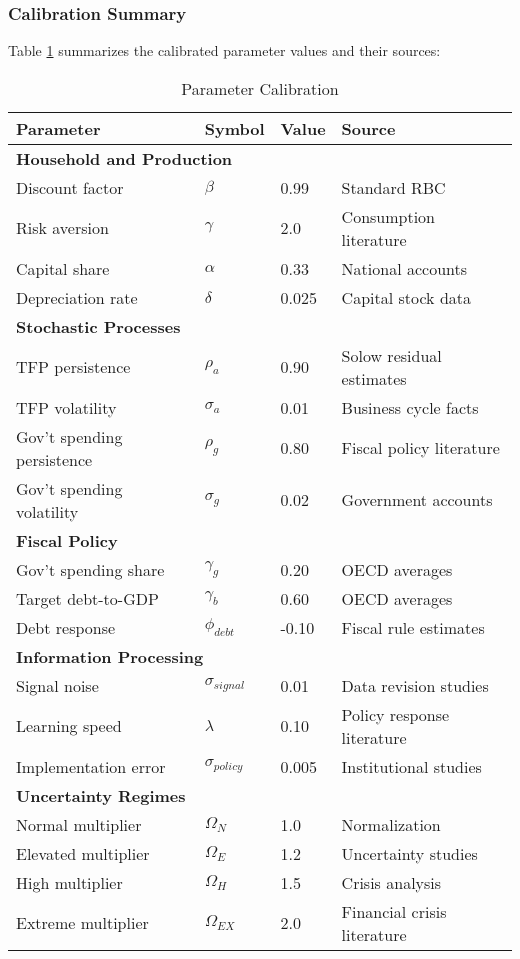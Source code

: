 \documentclass[5p,authoryear]{elsarticle}
\begin{document}
\subsubsection{Calibration Summary}

Table \ref{tab:calibration} summarizes the calibrated parameter values and their sources:

\begin{table}[h!]
\centering
\caption{Parameter Calibration}
\label{tab:calibration}
\begin{tabular}{llll}
\toprule
Parameter & Symbol & Value & Source \\
\midrule
\multicolumn{4}{l}{\textbf{Household and Production}} \\
Discount factor & $\beta$ & 0.99 & Standard RBC \\
Risk aversion & $\gamma$ & 2.0 & Consumption literature \\
Capital share & $\alpha$ & 0.33 & National accounts \\
Depreciation rate & $\delta$ & 0.025 & Capital stock data \\
\midrule
\multicolumn{4}{l}{\textbf{Stochastic Processes}} \\
TFP persistence & $\rho_a$ & 0.90 & Solow residual estimates \\
TFP volatility & $\sigma_a$ & 0.01 & Business cycle facts \\
Gov't spending persistence & $\rho_g$ & 0.80 & Fiscal policy literature \\
Gov't spending volatility & $\sigma_g$ & 0.02 & Government accounts \\
\midrule
\multicolumn{4}{l}{\textbf{Fiscal Policy}} \\
Gov't spending share & $\gamma_g$ & 0.20 & OECD averages \\
Target debt-to-GDP & $\gamma_b$ & 0.60 & OECD averages \\
Debt response & $\phi_{debt}$ & -0.10 & Fiscal rule estimates \\
\midrule
\multicolumn{4}{l}{\textbf{Information Processing}} \\
Signal noise & $\sigma_{signal}$ & 0.01 & Data revision studies \\
Learning speed & $\lambda$ & 0.10 & Policy response literature \\
Implementation error & $\sigma_{policy}$ & 0.005 & Institutional studies \\
\midrule
\multicolumn{4}{l}{\textbf{Uncertainty Regimes}} \\
Normal multiplier & $\Omega_N$ & 1.0 & Normalization \\
Elevated multiplier & $\Omega_E$ & 1.2 & Uncertainty studies \\
High multiplier & $\Omega_H$ & 1.5 & Crisis analysis \\
Extreme multiplier & $\Omega_{EX}$ & 2.0 & Financial crisis literature \\
\bottomrule
\end{tabular}
\end{table}
\end{document}
